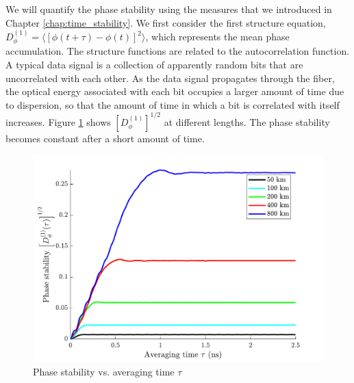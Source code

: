 We will quantify the phase stability using the measures that we introduced in Chapter \ref{chap:time_stability}. We first consider the first structure equation, $D^{(1)}_\phi = \langle [\phi(t+\tau) - \phi(t)]^2 \rangle$, which represents the mean phase accumulation. The structure functions are related to the autocorrelation function. A typical data signal is a collection of apparently random bits that are uncorrelated with each other. As the data signal propagates through the fiber, the optical energy associated with each bit occupies a larger amount of time due to dispersion, so that the amount of time in which a bit is correlated with itself increases. Figure \ref{fig:NAPhaseStability} shows $\left[D^{(1)}_\phi\right]^{1/2}$ at different lengths. The phase stability becomes constant after a short amount of time.
%
\begin{figure}[htb]
	\centering
	\includegraphics[scale=0.9]{img/NAPhaseStability}
	\caption{Phase stability vs. averaging time $\tau$} \label{fig:NAPhaseStability}
\end{figure}
%

